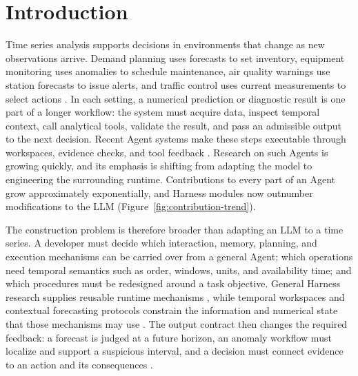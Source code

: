 \documentclass[preprints,article,submit,moreauthors]{Definitions/mdpi}
\begin{document}
\setlength{\headheight}{18pt}
\addtolength{\topmargin}{-6pt}

\hypersetup{
  colorlinks=true,
  linkcolor=surveyLink,
  citecolor=surveyLink,
  urlcolor=surveyLink
}

\section{Introduction}
\label{sec:intro}

Time series analysis supports decisions in environments that change as new observations arrive. Demand planning uses forecasts to set inventory, equipment monitoring uses anomalies to schedule maintenance, air quality warnings use station forecasts to issue alerts, and traffic control uses current measurements to select actions \citep{lim2021deepts,ma2025causal,collmllight2026}. In each setting, a numerical prediction or diagnostic result is one part of a longer workflow: the system must acquire data, inspect temporal context, call analytical tools, validate the result, and pass an admissible output to the next decision. Recent Agent systems make these steps executable through workspaces, evidence checks, and tool feedback \citep{tsagent2025,aion2026}. Research on such Agents is growing quickly, and its emphasis is shifting from adapting the model to engineering the surrounding runtime. Contributions to every part of an Agent grow approximately exponentially, and Harness modules now outnumber modifications to the LLM (Figure~\ref{fig:contribution-trend}).

The construction problem is therefore broader than adapting an LLM to a time series. A developer must decide which interaction, memory, planning, and execution mechanisms can be carried over from a general Agent; which operations need temporal semantics such as order, windows, units, and availability time; and which procedures must be redesigned around a task objective. General Harness research supplies reusable runtime mechanisms \citep{ning2026codeharness,lin2026agenticharness,guo2026harnesssurvey}, while temporal workspaces and contextual forecasting protocols constrain the information and numerical state that those mechanisms may use \citep{timeclaw2026explore,drcik2026}. The output contract then changes the required feedback: a forecast is judged at a future horizon, an anomaly workflow must localize and support a suspicious interval, and a decision must connect evidence to an action and its consequences \citep{chen2026tsagentsurvey}.
\end{document}
